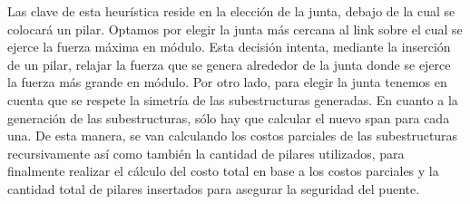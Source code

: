   
Las clave de esta heurística reside en la elección de la junta, debajo de la cual se colocará un pilar. Optamos por elegir la junta más cercana al link sobre el cual se ejerce la fuerza máxima en módulo. Esta decisión intenta, mediante la inserción de un  pilar, relajar la fuerza que se genera alrededor de la junta donde se ejerce la fuerza más grande en módulo. Por otro lado, para elegir la junta tenemos en cuenta que se respete la simetría de las subestructuras generadas. En cuanto a la generación de las subestructuras, sólo hay que calcular el nuevo span para cada una. De esta manera, se van calculando los costos parciales de las subestructuras recursivamente así como también la cantidad de pilares utilizados, para finalmente realizar el cálculo del costo total en base a los costos parciales y la cantidad total de pilares insertados para asegurar la seguridad del puente. \\
